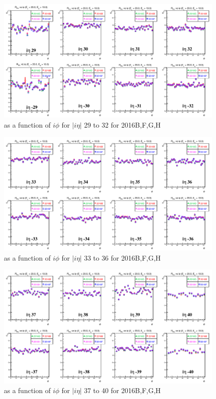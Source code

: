 \begin{figure}[h!]
\centering
\includegraphics[width=0.99\linewidth]{../Figures/Chap2/ImageFiles_HF/Ratio/2016/RvsIphi2016BFGH/ieta29_32_E1E2Cut0Ietaiphi}
\caption{\ratiosl as a function of $i\phi$ for $|i\eta|$ 29 to 32 for 2016B,F,G,H}
\label{fig:ieta29_32_E1E2Cut0Ietaiphi2016BFGH}
\end{figure}
\begin{figure}[h!]
\centering
\includegraphics[width=0.99\linewidth]{../Figures/Chap2/ImageFiles_HF/Ratio/2016/RvsIphi2016BFGH/ieta33_36_E1E2Cut0Ietaiphi}
\caption{\ratiosl as a function of $i\phi$ for $|i\eta|$ 33 to 36 for 2016B,F,G,H}
\label{fig:ieta33_36_E1E2Cut0Ietaiphi2016BFGH}
\end{figure}
\begin{figure}[h!]
\centering
\includegraphics[width=0.99\linewidth]{../Figures/Chap2/ImageFiles_HF/Ratio/2016/RvsIphi2016BFGH/ieta37_40_E1E2Cut0Ietaiphi}
\caption{\ratiosl as a function of $i\phi$ for $|i\eta|$ 37 to 40 for 2016B,F,G,H}
\label{fig:ieta37_40_E1E2Cut0Ietaiphi2016BFGH}
\end{figure}
